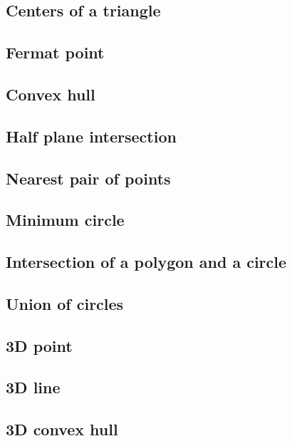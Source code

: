 \documentclass[titlepage,a4paper,10pt]{article}
\begin{document}
\begin{multicols}{2}
\begin{spacing}{0.6}
{			\subsection{Centers of a triangle}
				
			\subsection{Fermat point}
				
			\subsection{Convex hull}
				
			\subsection{Half plane intersection}
				
			\subsection{Nearest pair of points}
				
			\subsection{Minimum circle}
				
			\subsection{Intersection of a polygon and a circle}
				
			\subsection{Union of circles}
				
			\subsection{3D point}
				
			\subsection{3D line}
				
			\subsection{3D convex hull}
				
}
\end{spacing}
\end{multicols}
\end{document}
